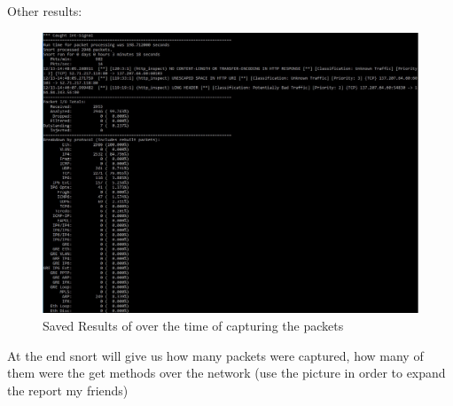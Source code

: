 \documentclass{article}
\begin{document}
Other results:

\begin{figure}[H]
	\begin{center}
		\includegraphics[width=0.6
\textwidth]{Res3.jpg}
	\end{center}
	\caption{Saved Results of over the time of capturing the packets}
	\label{fig:Res3}
\end{figure}

At the end snort will give us how many packets were captured, how many of them were the get methods over the network (use the picture in order to expand the report my friends)
\newpage
\tableofcontents



\end{document}
